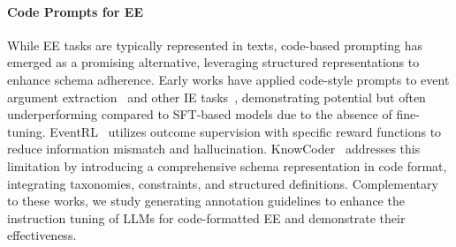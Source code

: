 \paragraph{Code Prompts for EE} 
While EE tasks are typically represented in texts, code-based prompting has emerged as a promising alternative, leveraging structured representations to enhance schema adherence. Early works have applied code-style prompts to event argument extraction~\cite{wang2023code4struct} and other IE tasks~\cite{li-etal-2023-codeie}, demonstrating potential but often underperforming compared to SFT-based models due to the absence of fine-tuning. EventRL~\cite{gao2024eventrlenhancingeventextraction} utilizes outcome supervision with specific reward functions to reduce information mismatch and hallucination. KnowCoder~\cite{sainz2024gollie, li-etal-2024-knowcoder} addresses this limitation by introducing a comprehensive schema representation in code format, integrating taxonomies, constraints, and structured definitions. 
Complementary to these works, we study generating annotation guidelines to enhance the instruction tuning of LLMs for code-formatted EE and demonstrate their effectiveness.
